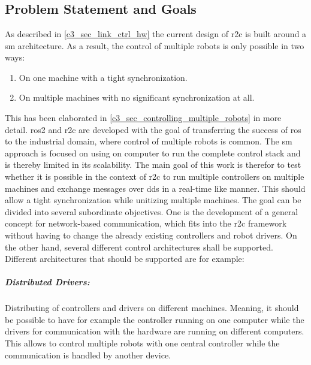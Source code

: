 \chapter{}
\label{sec:concept}

\section{Problem Statement and Goals}
As described in \autoref{c3_sec_link_ctrl_hw} the current design of \gls{r2c} is built around a \gls{sm} architecture. As a result, the control of multiple robots is only possible in two ways: 
\begin{enumerate}
    \item On one machine with a tight synchronization. 
    \item On multiple machines with no significant synchronization at all.
\end{enumerate}
This has been elaborated in \autoref{c3_sec_controlling_multiple_robots} in more detail. \gls{ros2} and \gls{r2c} are developed with the goal of transferring the success of \gls{ros} to the industrial domain, where control of multiple robots is common. The \gls{sm} approach is focused on using on computer to run the complete control stack and is thereby limited in its scalability. The main goal of this work is therefor to  test whether it is possible in the context of \gls{r2c} to run multiple controllers on multiple machines and exchange messages over \gls{dds} in a real-time like manner. This should allow a tight synchronization while unitizing multiple machines.\newline
The goal can be divided into several subordinate objectives. One is the development of a general concept for network-based communication, which fits into the \gls{r2c} framework without having to change the already existing controllers and robot drivers. On the other hand, several different control architectures shall be supported. Different architectures that should be supported are for example:
\paragraph{Distributed Drivers:}\label{c4_sec_distributed_drivers}
 Distributing of controllers and drivers on different machines. Meaning, it should be possible to have for example the controller running on one computer while the drivers for communication with the hardware are running on different computers. This allows to control multiple robots with one central controller while the communication is handled by another device.
